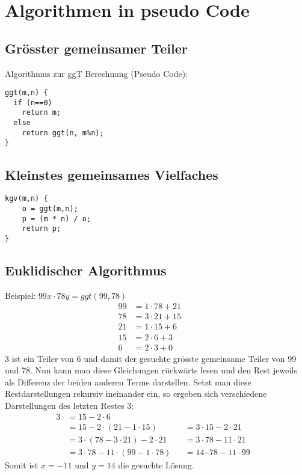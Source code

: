 \renewcommand{\thesection}{\Alph{section}}
\appendix
{}
\section{Algorithmen in pseudo Code}
\subsection{Grösster gemeinsamer Teiler} %
Algorithmus zur ggT Berechnung (Pseudo Code):
\begin{lstlisting}
ggt(m,n) {
  if (n==0)
    return m;
  else
    return ggt(n, m%n);
}
\end{lstlisting}

\subsection{Kleinstes gemeinsames Vielfaches} %
\label{sec:kleinstes_gemeinsames_vielfaches}
\begin{lstlisting}
kgv(m,n) {
    o = ggt(m,n);
    p = (m * n) / o;
    return p;
}
\end{lstlisting}

\subsection{Euklidischer Algorithmus} %
\label{sec:euklidischer_algorithmus}
Beispiel: \(99x \cdot 78y = ggt(99,78)\)
\begin{align*}
99 &= 1 \cdot 78 + 21 && \\
78 &= 3 \cdot 21 + 15 &&\\
21 &= 1 \cdot 15 + 6 &&\\
15 &= 2 \cdot 6 + 3 &&\\
 6 &= 2 \cdot 3 + 0 &&
\end{align*}
\(3\) ist ein Teiler von 6 und damit der gesuchte grösste gemeinsame Teiler von 99 und 78.
Nun kann man diese Gleichungen rückwärts lesen und den Rest jeweils als Differenz der beiden anderen Terme darstellen. Setzt man diese Restdarstellungen rekursiv ineinander ein, so ergeben sich verschiedene Darstellungen des letzten Restes 3:
\begin{align*}
	3 &= 15 - 2 \cdot 6 \\
	&= 15 - 2 \cdot (21 - 1 \cdot 15) & &= 3 \cdot 15 - 2 \cdot 21 &\\
	&= 3\cdot (78 - 3 \cdot 21) - 2 \cdot 21 & &= 3 \cdot 78 - 11 \cdot 21 &\\
	&= 3 \cdot 78 - 11 \cdot (99-1 \cdot 78) & &= 14 \cdot 78 - 11 \cdot 99 &
\end{align*}
Somit ist \(x = -11\) und \(y=14\) die gesuchte Lösung.

